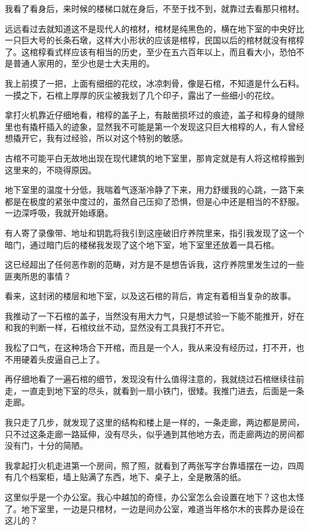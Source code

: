 我看了看身后，来时候的楼梯口就在身后，不至于找不到，就靠过去看那只棺材。

远远看过去就知道这不是现代人的棺材，棺材是纯黑色的，横在地下室的中央好比一只巨大号的长条石墩，这样大小形状的应该是棺椁，民国以后的棺材就没有棺椁了。这棺椁看式样应该有相当的历史，至少在五六百年以上，而且看大小，恐怕不是普通人家用的，至少也是士大夫用的。

我上前摸了一把，上面有细细的花纹，冰凉刺骨，像是石棺，不知道是什么石料。一摸之下，石棺上厚厚的灰尘被我划了几个印子，露出了一些细小的花纹。

拿打火机靠近仔细地看，棺椁的盖子上，有敲凿损坏过的痕迹，盖子和椁身的缝隙里也有撬杆插入的迹象，显然我不可能是第一个发现这只巨大棺椁的人，有人曾经想撬开它，我有过经验，所以对这个特别的敏感。

古棺不可能平白无故地出现在现代建筑的地下室里，那肯定就是有人将这棺椁搬到这里来的，不晓得原因。

地下室里的温度十分低，我喘着气逐渐冷静了下来，用力舒缓我的心跳，一路下来都是在极度的紧张中度过的，虽然自己压抑了恐惧，但是心中还是相当的不舒服。一边深呼吸，我就开始琢磨。

有人寄了录像带、地址和钥匙将我引到这座破旧疗养院里来，指引我发现了这一个暗门，通过暗门后的楼梯我发现了这个地下室，地下室里还放着一具石棺。

这已经超出了任何恶作剧的范畴，对方是不是想告诉我，这疗养院里发生过的一些匪夷所思的事情？

看来，这封闭的楼层和地下室，以及这石棺的背后，肯定有着相当复杂的故事。

我推动了一下石棺的盖子，当然没有用大力气，只是想试验一下能不能推开，好在和我的判断一样，石棺纹丝不动，显然没有工具我打不开它。

我松了口气，在这种场合下开棺，而且是一个人，我从来没有经历过，打不开，也不用硬着头皮逼自己上了。

再仔细地看了一遍石棺的细节，发现没有什么值得注意的，我就绕过石棺继续往前走，一直走到地下室的尽头，就看到一扇小铁门，很矮。我推门进去，后面是一条走廊。

我只走了几步，就发现了这里的结构和楼上是一样的，一条走廊，两边都是房间，只不过这条走廊一路延伸，没有尽头，似乎通到其他地方去，而走廊两边的房间都没有门，十分的简陋。

我拿起打火机走进第一个房间，照了照，就看到了两张写字台靠墙摆在一边，四周有几个档案柜，墙上贴满了东西，地下、桌子上，全是散落的纸。

这里似乎是一个办公室。我心中越加的奇怪，办公室怎么会设置在地下？这也太怪了。地下室里，一边是只棺材，一边是间办公室，难道当年格尔木的丧葬办是设在这儿的？

